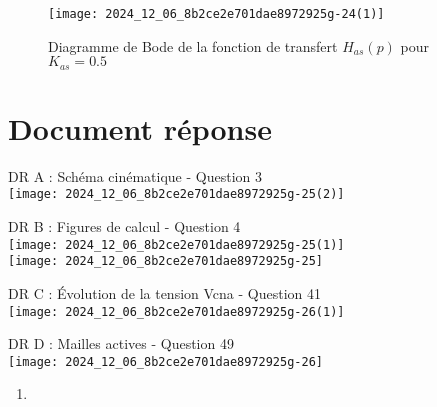 \begin{figure}[!htb]
\begin{center}
\texttt{[image: 2024\_12\_06\_8b2ce2e701dae8972925g-24(1)]}
\caption{Diagramme de Bode de la fonction de transfert \(H_{a s}(p)\) pour \(K_{a s}=0.5\) \label{fig20}}
\end{center}
\end{figure}

\section{Document réponse}
DR A : Schéma cinématique - Question 3\\
\texttt{[image: 2024\_12\_06\_8b2ce2e701dae8972925g-25(2)]}

DR B : Figures de calcul - Question 4\\
\texttt{[image: 2024\_12\_06\_8b2ce2e701dae8972925g-25(1)]}\\
\texttt{[image: 2024\_12\_06\_8b2ce2e701dae8972925g-25]}

DR C : Évolution de la tension Vcna - Question 41\\
\texttt{[image: 2024\_12\_06\_8b2ce2e701dae8972925g-26(1)]}

DR D : Mailles actives - Question 49\\
\texttt{[image: 2024\_12\_06\_8b2ce2e701dae8972925g-26]}

\begin{enumerate}
  \item 
\end{enumerate}
%
